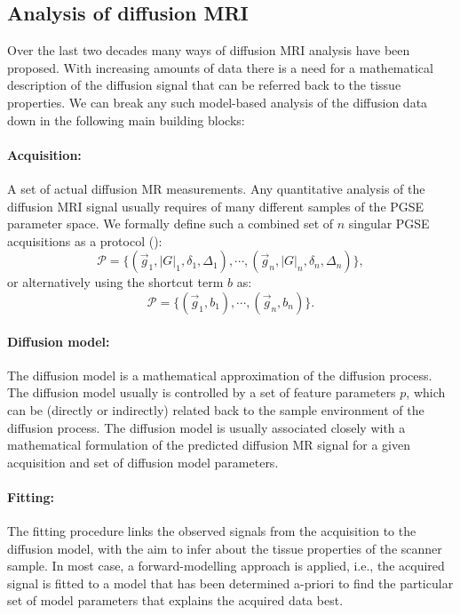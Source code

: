 \subsection*{Analysis of diffusion MRI}
Over the last two decades many ways of diffusion MRI analysis have been proposed. With increasing amounts of data there is a need for a mathematical description of the diffusion signal that can be referred back to the tissue properties. We can break any such model-based analysis of the diffusion data down in the following main building blocks: 

\paragraph{Acquisition:} A set of actual diffusion MR measurements. Any quantitative analysis of the diffusion MRI signal usually requires of many different samples of the PGSE parameter space. We formally define such a combined set of $n$ singular PGSE acquisitions as a protocol (\prot):
\begin{equation}
	\mathcal{P} = \{(\vec{g}_1,|G|_1,\delta_1,\Delta_1),\cdots,(\vec{g}_n,|G|_n,\delta_n,\Delta_n)\},
\end{equation}
or alternatively using the shortcut term $b$ as:
\begin{equation*}		
	\mathcal{P} = \{(\vec{g}_1,b_1),\cdots,(\vec{g}_n,b_n)\}.
\end{equation*}
\paragraph{Diffusion model:} The diffusion model is a mathematical approximation of the diffusion process. The diffusion model usually is controlled by a set of feature parameters $p$, which can be (directly or indirectly) related back to the sample environment of the diffusion process. The diffusion model is usually associated closely with a mathematical formulation of the predicted diffusion MR signal for a given acquisition and set of diffusion model parameters.
\paragraph{Fitting:} The fitting procedure links the observed signals from the acquisition to the diffusion model, with the aim to infer about the tissue properties of the scanner sample. In most case, a forward-modelling approach is applied, i.e., the acquired signal is fitted to a model that has been determined a-priori to find the particular set of model parameters that explains the acquired data best.  

